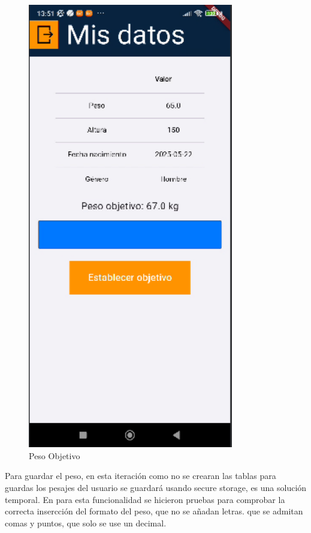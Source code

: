 \begin{figure}[H]
   \centering
    \includegraphics[width=0.8\textwidth]{pantallas/pesoObj.png}
    \caption{Peso Objetivo}
    \label{fig:pesoObj}
\end{figure}

Para guardar el peso, en esta iteración como no se crearan las tablas para guardas los pesajes del usuario se guardará usando secure storage, es una solución temporal. En para esta funcionalidad se hicieron pruebas para comprobar la correcta insercción del formato del peso, que no se añadan letras. que se admitan comas y puntos, que solo se use un decimal.

